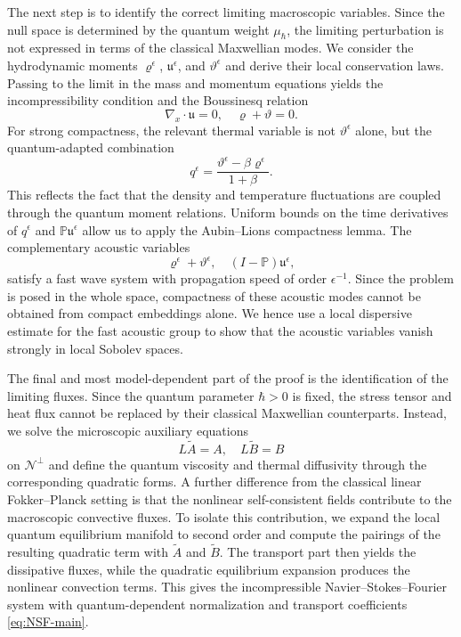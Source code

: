 \documentclass[10pt,reqno]{amsart}
\numberwithin{equation}{section}
\newcommand{\mP}{\mathbb{P}}
\newcommand{\vrh}{\varrho}
\newcommand{\vth}{\vartheta}
\newcommand{\mfu}{\mathfrak{u}}
\newcommand{\calN}{\mathcal N}
\begin{document}
The next step is to identify the correct limiting macroscopic variables. Since the null space is determined by the quantum weight $\mu_\hbar$, the limiting perturbation is not expressed in terms of the classical Maxwellian modes. We consider the hydrodynamic moments $\vrh^\epsilon$, $\mfu^\epsilon$, and $\vth^\epsilon$ and derive their local conservation laws. Passing to the limit in the mass and momentum equations yields the incompressibility condition and the Boussinesq relation
\[
\nabla_x\cdot\mfu=0,\quad \vrh+\vth=0.
\]
For strong compactness, the relevant thermal variable is not $\vth^\epsilon$ alone, but the quantum-adapted combination
\[
q^\epsilon=\frac{\vth^\epsilon-\beta\vrh^\epsilon}{1+\beta}.
\]
This reflects the fact that the density and temperature fluctuations are coupled through the quantum moment relations. Uniform bounds on the time derivatives of $q^\epsilon$ and $\mP\mfu^\epsilon$ allow us to apply the Aubin--Lions compactness lemma. The complementary acoustic variables
\[
\vrh^\epsilon+\vth^\epsilon,\quad (I-\mP)\mfu^\epsilon,
\]
satisfy a fast wave system with propagation speed of order $\epsilon^{-1}$. Since the problem is posed in the whole space, compactness of these acoustic modes cannot be obtained from compact embeddings alone. We hence use a local dispersive estimate for the fast acoustic group to show that the acoustic variables vanish strongly in local Sobolev spaces.

The final and most model-dependent part of the proof is the identification of the limiting fluxes. Since the quantum parameter $\hbar>0$ is fixed, the stress tensor and heat flux cannot be replaced by their classical Maxwellian counterparts. Instead, we solve the microscopic auxiliary equations
\[
L\widetilde A=A,\quad L\widetilde B=B
\]
on $\calN^\perp$ and define the quantum viscosity and thermal diffusivity through the corresponding quadratic forms. A further difference from the classical linear Fokker--Planck setting is that the nonlinear self-consistent fields contribute to the macroscopic convective fluxes. To isolate this contribution, we expand the local quantum equilibrium manifold to second order and compute the pairings of the resulting quadratic term with $\widetilde A$ and $\widetilde B$. The transport part then yields the dissipative fluxes, while the quadratic equilibrium expansion produces the nonlinear convection terms. This gives the incompressible Navier--Stokes--Fourier system with quantum-dependent normalization and transport coefficients \eqref{eq:NSF-main}.
 
\end{document}
